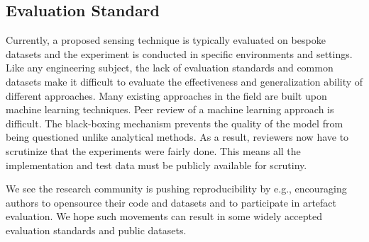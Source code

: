 
\subsection{Evaluation Standard}
Currently, a proposed sensing technique is typically evaluated on bespoke datasets and the experiment is conducted in specific environments
and settings. Like any engineering subject, the lack of evaluation standards and common datasets make it difficult to evaluate the
effectiveness and generalization ability of different approaches. Many existing approaches in the field are built upon machine learning
techniques. Peer review of a machine learning approach is difficult. The black-boxing mechanism prevents the quality of the model from
being questioned unlike analytical methods. As a result, reviewers now have to scrutinize that the experiments were fairly done. This means
all the implementation and test data must be publicly available for scrutiny.

We see the research community is pushing reproducibility by e.g., encouraging authors to opensource their code and datasets and to
participate in artefact evaluation. We hope such movements can result in some widely accepted evaluation standards and public datasets.


